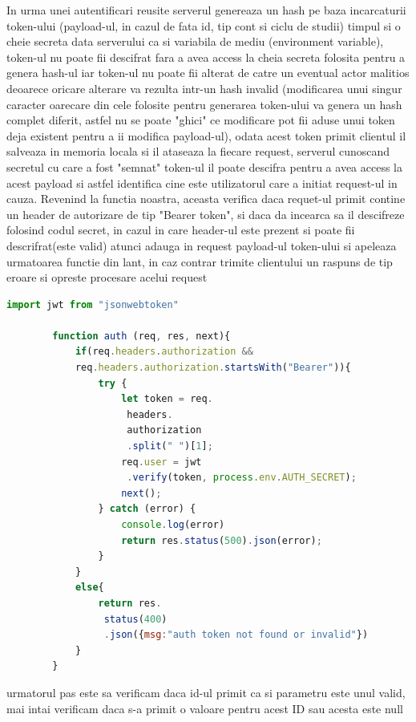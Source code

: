 \documentclass[12pt,a4paper,hidelinks]{report}
\theoremstyle{definition}
\theoremstyle{remark}
\begin{document}
    In urma unei autentificari reusite
    serverul genereaza un hash pe baza incarcaturii token-ului (payload-ul, in cazul de fata id, tip cont si ciclu de studii)
    timpul si o cheie secreta data serverului ca si variabila de mediu (environment variable), token-ul nu poate fii descifrat
    fara a avea access la cheia secreta folosita pentru a genera hash-ul iar token-ul nu poate fii alterat de catre
    un eventual actor malitios deoarece oricare alterare va rezulta intr-un hash invalid
    (modificarea unui singur caracter oarecare din cele folosite pentru generarea token-ului va genera un hash complet diferit, astfel
    nu se poate "ghici" ce modificare pot fii aduse unui token deja existent pentru a ii modifica payload-ul), odata acest token primit
    clientul il salveaza in memoria locala si il ataseaza la fiecare request, serverul cunoscand secretul cu care a fost "semnat" token-ul
    il poate descifra pentru a avea access la acest payload si astfel identifica cine este utilizatorul care a initiat request-ul in cauza.
    Revenind la functia noastra, aceasta verifica daca requet-ul primit contine un header de autorizare de tip "Bearer token",
    si daca da incearca sa il descifreze folosind codul secret, in cazul in care header-ul este prezent si poate fii descrifrat(este valid) atunci
    adauga in request payload-ul token-ului si apeleaza urmatoarea functie din lant, in caz contrar trimite clientului un raspuns de tip eroare si opreste procesare acelui request
    \begin{lstlisting}[language=Javascript]
        import jwt from "jsonwebtoken"

        function auth (req, res, next){
            if(req.headers.authorization &&
            req.headers.authorization.startsWith("Bearer")){
                try {
                    let token = req.
                     headers.
                     authorization
                     .split(" ")[1];
                    req.user = jwt
                     .verify(token, process.env.AUTH_SECRET);
                    next();
                } catch (error) {
                    console.log(error)
                    return res.status(500).json(error);
                }
            }
            else{
                return res.
                 status(400)
                 .json({msg:"auth token not found or invalid"})
            }
        }
    \end{lstlisting}
    urmatorul pas este sa verificam daca id-ul primit ca si parametru este unul valid, mai intai verificam daca s-a primit o valoare pentru acest ID sau acesta este null
\end{document}
